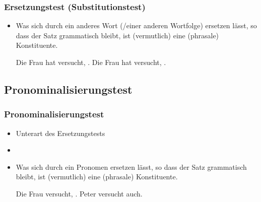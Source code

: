 \begin{frame}
\frametitle{Ersetzungstest (Substitutionstest)}

\begin{itemize}
	\item Was sich durch ein anderes Wort (/einer anderen Wortfolge) ersetzen lässt, so dass der Satz grammatisch bleibt, ist (vermutlich) eine (phrasale) Konstituente.

	\eal 
	\zl

\pause	
	\eal 
	\ex Die Frau hat versucht, .
	\ex Die Frau hat versucht, .
	\zl
	
\end{itemize}

\end{frame}


\subsection{Pronominalisierungstest}

\begin{frame}
\frametitle{Pronominalisierungstest}

\begin{itemize}
	\item Unterart des Ersetzungstests
	\item[]
	\item Was sich durch ein Pronomen ersetzen lässt, so dass der Satz grammatisch bleibt, ist (vermutlich) eine (phrasale) Konstituente.

	\eal 
	\zl

\pause	
	\eal 
	\ex Die Frau versucht, .
	\ex Peter versucht \alertred{[das]} auch.
	\zl
	
\end{itemize}

\end{frame}


